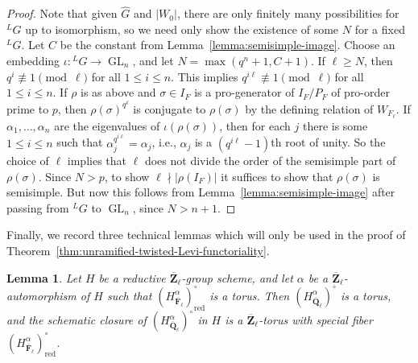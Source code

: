\documentclass[reqno]{amsart}
\numberwithin{equation}{subsection}
\newcommand{\F}{\mathbf{F}}
\newcommand{\Q}{\mathbf{Q}}
\newcommand{\Z}{\mathbf{Z}}
\newcommand{\ol}[1]{\overline{#1}}
\newcommand{\ld}{{}^L}
\DeclareMathOperator{\GL}{GL}
\DeclareMathOperator{\red}{red}
\newtheorem{lemma}[thm]{Lemma}
\theoremstyle{remark}
\numberwithin{equation}{subsection}
\numberwithin{figure}{subsection}
\begin{document}
\begin{proof}
Note that given $\widehat{G}$ and $|W_0|$, there are only finitely many possibilities for $\ld G$ up to isomorphism, so we need only show the existence of some $N$ for a fixed $\ld G$. Let $C$ be the constant from Lemma~\ref{lemma:semisimple-image}. Choose an embedding $\iota\colon \ld G \to \GL_n$, and let $N = \max(q^n+1,C+1)$. If $\ell \geq N$, then $q^i \not\equiv 1 \pmod\ell$ for all $1 \leq i \leq n$. This implies $q^{i\ell} \not\equiv 1 \pmod\ell$ for all $1 \leq i \leq n$. If $\rho$ is as above and $\sigma \in I_F$ is a pro-generator of $I_F/P_F$ of pro-order prime to $p$, then $\rho(\sigma)^{q^\ell}$ is conjugate to $\rho(\sigma)$ by the defining relation of $W_{F_\ell}$. If $\alpha_1, \dots, \alpha_n$ are the eigenvalues of $\iota(\rho(\sigma))$, then for each $j$ there is some $1 \leq i \leq n$ such that $\alpha_j^{q^{i\ell}} = \alpha_j$, i.e., $\alpha_j$ is a $(q^{i\ell} - 1)$th root of unity. So the choice of $\ell$ implies that $\ell$ does not divide the order of the semisimple part of $\rho(\sigma)$. Since $N > p$, to show $\ell \nmid |\rho(I_F)|$ it suffices to show that $\rho(\sigma)$ is semisimple. But now this follows from Lemma~\ref{lemma:semisimple-image} after passing from $\ld G$ to $\GL_n$, since $N > n+1$.
\end{proof}

Finally, we record three technical lemmas which will only be used in the proof of Theorem~\ref{thm:unramified-twisted-Levi-functoriality}.

\begin{lemma}\label{lemma:fixed-point-torus-flat}
Let $H$ be a reductive $\ol\Z_\ell$-group scheme, and let $\alpha$ be a $\ol\Z_\ell$-automorphism of $H$ such that $(H^\alpha_{\ol\F_\ell})^\circ_{\red}$ is a torus. Then $(H^\alpha_{\ol\Q_\ell})^\circ$ is a torus, and the schematic closure of $(H^\alpha_{\ol\Q_\ell})^\circ$ in $H$ is a $\ol\Z_\ell$-torus with special fiber $(H^\alpha_{\ol\F_\ell})^\circ_{\red}$.
\end{lemma}
\end{document}
